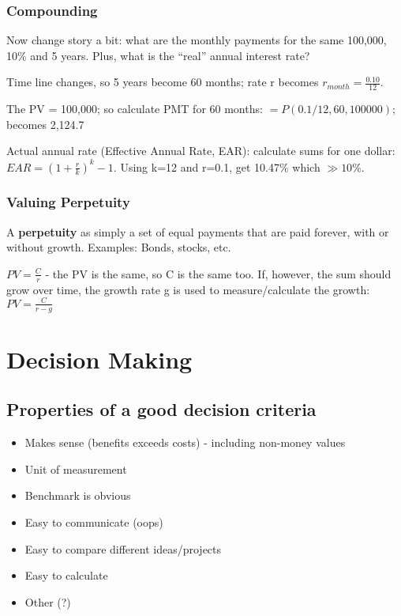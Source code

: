 \documentclass{scrartcl}
\begin{document}
\subsubsection{Compounding}
\label{sec:3-8}

Now change story a bit: what are the monthly payments for the same 100,000, 10\%
and 5 years. Plus, what is the ``real'' annual interest rate?

Time line changes, so 5 years become 60 months; rate r becomes $r_{month} =
\frac{0.10}{12}$.

The PV = 100,000; so calculate PMT for 60 months: $=P(0.1/12, 60, 100000)$;
becomes 2,124.7

Actual annual rate (Effective Annual Rate, EAR): calculate sums for one dollar:
$EAR=\left(1 + \frac{r}{k}\right)^k - 1$. Using k=12 and r=0.1, get 10.47\%
which $\gg 10\%$.

\subsubsection{Valuing Perpetuity}
\label{sec:3-9}

A {\bf perpetuity} as simply a set of equal payments that are paid forever, with
or without growth. Examples: Bonds, stocks, etc.

$PV = \frac{C}{r}$ - the PV is the same, so C is the same too. If, however, the
sum should grow over time, the growth rate g is used to measure/calculate the
growth: $PV = \frac{C}{r-g}$

\section{Decision Making}
\label{sec:4}

\subsection{Properties of a good decision criteria}
\label{sec:4-2}

\begin{itemize}
\item Makes sense (benefits exceeds costs) - including non-money values
\item Unit of measurement
\item Benchmark is obvious
\item Easy to communicate (oops)
\item Easy to compare different ideas/projects
\item Easy to calculate
\item Other (?)
\end{itemize}
\end{document}
